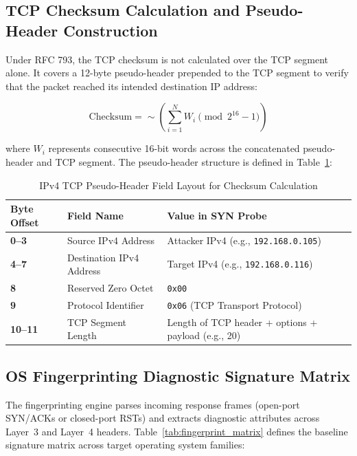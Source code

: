 \documentclass[11pt,a4paper]{article}
\begin{document}
\subsection{TCP Checksum Calculation and Pseudo-Header Construction}
Under RFC 793, the TCP checksum is not calculated over the TCP segment alone. It covers a 12-byte pseudo-header prepended to the TCP segment to verify that the packet reached its intended destination IP address:

\begin{equation}
\text{Checksum} = \sim \left( \sum_{i=1}^{N} W_i \pmod{2^{16} - 1} \right)
\end{equation}

where $W_i$ represents consecutive 16-bit words across the concatenated pseudo-header and TCP segment. The pseudo-header structure is defined in Table~\ref{tab:pseudo_header}:

\begin{table}[ht]
\centering
\small
\renewcommand{\arraystretch}{1.25}
\caption{IPv4 TCP Pseudo-Header Field Layout for Checksum Calculation}
\label{tab:pseudo_header}
\begin{tabularx}{\textwidth}{>{\raggedright\arraybackslash\bfseries}p{2.6cm} >{\raggedright\arraybackslash}p{4.8cm} >{\raggedright\arraybackslash}X}
\toprule
\textbf{Byte Offset} & \textbf{Field Name} & \textbf{Value in SYN Probe} \\
\midrule
0--3  & Source IPv4 Address      & Attacker IPv4 (e.g., \texttt{192.168.0.105}) \\
4--7  & Destination IPv4 Address & Target IPv4 (e.g., \texttt{192.168.0.116}) \\
8     & Reserved Zero Octet      & \texttt{0x00} \\
9     & Protocol Identifier      & \texttt{0x06} (TCP Transport Protocol) \\
10--11& TCP Segment Length       & Length of TCP header + options + payload (e.g., 20) \\
\bottomrule
\end{tabularx}
\end{table}

\subsection{OS Fingerprinting Diagnostic Signature Matrix}
The fingerprinting engine parses incoming response frames (open-port SYN/ACKs or closed-port RSTs) and extracts diagnostic attributes across Layer~3 and Layer~4 headers. Table~\ref{tab:fingerprint_matrix} defines the baseline signature matrix across target operating system families:
\end{document}
